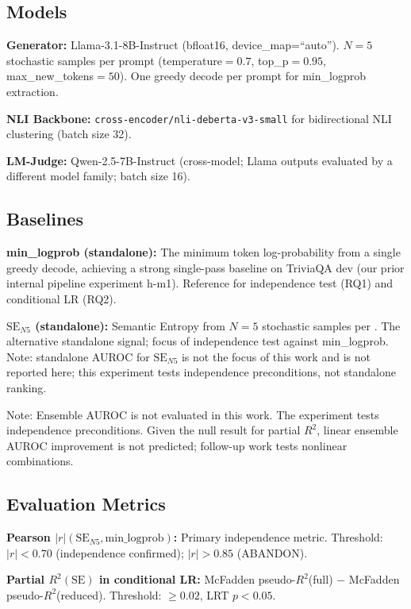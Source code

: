 \subsection{Models}

\textbf{Generator:} Llama-3.1-8B-Instruct (bfloat16, device\_map=``auto''). $N=5$ stochastic samples per prompt (temperature$=0.7$, top\_p$=0.95$, max\_new\_tokens$=50$). One greedy decode per prompt for min\_logprob extraction.

\textbf{NLI Backbone:} \texttt{cross-encoder/nli-deberta-v3-small} for bidirectional NLI clustering (batch size 32).

\textbf{LM-Judge:} Qwen-2.5-7B-Instruct (cross-model; Llama outputs evaluated by a different model family; batch size 16).

\subsection{Baselines}

\textbf{min\_logprob (standalone):} The minimum token log-probability from a single greedy decode, achieving a strong single-pass baseline on TriviaQA dev (our prior internal pipeline experiment h-m1). Reference for independence test (RQ1) and conditional LR (RQ2).

\textbf{$\text{SE}_{N5}$ (standalone):} Semantic Entropy from $N=5$ stochastic samples per \citet{kuhn2023semantic}. The alternative standalone signal; focus of independence test against min\_logprob. Note: standalone AUROC for $\text{SE}_{N5}$ is not the focus of this work and is not reported here; this experiment tests independence preconditions, not standalone ranking.

Note: Ensemble AUROC is not evaluated in this work. The experiment tests independence preconditions. Given the null result for partial $R^2$, linear ensemble AUROC improvement is not predicted; follow-up work tests nonlinear combinations.

\subsection{Evaluation Metrics}

\textbf{Pearson $|r|(\text{SE}_{N5}, \text{min\_logprob})$:} Primary independence metric. Threshold: $|r| < 0.70$ (independence confirmed); $|r| > 0.85$ (ABANDON).

\textbf{Partial $R^2(\text{SE})$ in conditional LR:} McFadden pseudo-$R^2$(full) $-$ McFadden pseudo-$R^2$(reduced). Threshold: $\geq 0.02$, LRT $p < 0.05$.

